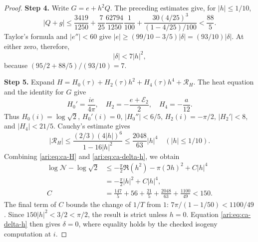 \begin{proof}
\noindent\textbf{Step 4.} Write $G=e+h^2Q$. The preceding estimates give, for $|h|\le1/10$,
\[
 |Q+g|\le
 \frac{3419}{1250}+\frac7{25}\frac{62794}{1250}\frac1{100}
       +\frac{30(4/25)^3}{(1-4/25)/100}<\frac{88}{5}.
\]
Taylor's formula and $|e''|<60$ give
$|e|\ge(99/10-3/5)|\delta|=(93/10)|\delta|$.
At either zero, therefore,
\begin{equation}\label{ari:eq:ca-delta-h}
 |\delta|<7|h|^2,
\end{equation}
because $(95/2+88/5)/(93/10)=7$.


\noindent\textbf{Step 5.} Expand
$H=H_0(\tau)+H_2(\tau)h^2+H_4(\tau)h^4+\mathcal R_H$.
The heat equation and the identity for $G$ give
\[
 H_0'=\frac{ie}{4\pi},\quad
 H_2=-\frac{e+\mathcal E_2}{2},\quad H_4=-\frac a{12}.
\]
Thus $H_0(i)=\log\sqrt2$, $H_0'(i)=0$,
$|H_0''|<6/5$, $H_2(i)=-\pi/2$, $|H_2'|<8$, and
$|H_4|<21/5$. Cauchy's estimate gives
\[
 |\mathcal R_H|\le
 \frac{(2/3)(4|h|)^6}{1-16|h|^2}
 \le\frac{2048}{63}|h|^4
 \quad (|h|\le1/10).
\]
Combining \eqref{ari:eq:ca-H} and \eqref{ari:eq:ca-delta-h}, we obtain
\begin{align*}
 \log \mathcal N-\log\sqrt2
 &\le-\frac\pi2\Re(h^2)-\pi(\Im h)^2+C|h|^4\\
 &=-\frac\pi2|h|^2+C|h|^4,\\
 C&=\frac{147}{5}+56+\frac{21}{5}
                 +\frac{2048}{63}+\frac{1100}{49}<150.
\end{align*}
The final term of $C$ bounds the change of $1/T$ from $1$:
$7\pi/(1-1/50)<1100/49$. Since $150|h|^2<3/2<\pi/2$,
the result is strict unless $h=0$. Equation
\eqref{ari:eq:ca-delta-h} then gives $\delta=0$, where equality
holds by the checked isogeny computation at $i$.
\end{proof}

